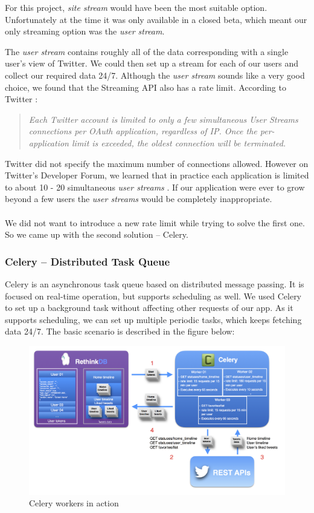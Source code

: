 \documentclass{article}
\begin{document}
\noindent For this project, \textit{site stream} would have been the most suitable option. Unfortunately at the time it was only available in a closed beta, which meant our only streaming option was the \textit{user stream}.

The \textit{user stream} contains roughly all of the data corresponding with a single user’s view of Twitter. We could then set up a stream for each of our users and collect our required data 24/7. Although the \textit{user stream} sounds like a very good choice, we found that the Streaming API also has a rate limit. According to Twitter \cite{streaming}:

\begin{quote}
    \emph{\small Each Twitter account is limited to only a few simultaneous User Streams connections per OAuth application, regardless of IP. Once the per-application limit is exceeded, the oldest connection will be terminated.}  
\end{quote} 

Twitter did not specify the maximum number of connections allowed. However on Twitter's Developer Forum, we learned that in practice each application is limited to about 10 - 20 simultaneous \textit{user streams} \cite{max}. If our application were ever to grow beyond a few users the \textit{user streams} would be completely inappropriate.
\\\\
We did not want to introduce a new rate limit while trying to solve the first one. So we came up with the second solution -- Celery.	

\subsubsection*{Celery -- Distributed Task Queue} \label{celery} %
Celery is an asynchronous task queue based on distributed message passing. It is focused on real-time operation, but supports scheduling as well. We used Celery to set up a background task without affecting other requests of our app. As it supports scheduling, we can set up multiple periodic tasks, which keeps fetching data 24/7. The basic scenario is described in the figure below:

\begin{figure}[H]
    \centering
    \includegraphics[width=\textwidth]{celery_scenario} 
    \caption{Celery workers in action}
\end{figure}
\end{document}
